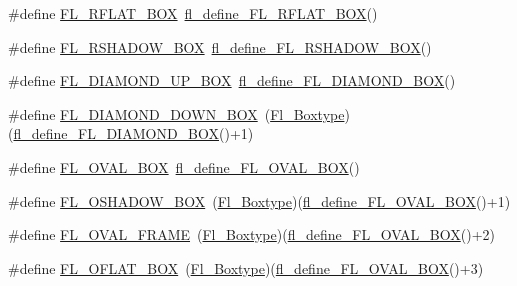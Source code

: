 \begin{DoxyCompactItemize}
\item 
\#define \hyperlink{_enumerations_8_h_a4a3f9e7a782892ca79eec39a02c704b4}{F\+L\+\_\+\+R\+F\+L\+A\+T\+\_\+\+B\+OX}~\hyperlink{_enumerations_8_h_a6f64fe52f3ed86bde407c67a61f5a2a4}{fl\+\_\+define\+\_\+\+F\+L\+\_\+\+R\+F\+L\+A\+T\+\_\+\+B\+OX}()
\item 
\#define \hyperlink{_enumerations_8_h_ad14eab3302b2d306b87e61e3bc93f127}{F\+L\+\_\+\+R\+S\+H\+A\+D\+O\+W\+\_\+\+B\+OX}~\hyperlink{_enumerations_8_h_a7c68477f8da9f5fc9af0b1d0e20d79a3}{fl\+\_\+define\+\_\+\+F\+L\+\_\+\+R\+S\+H\+A\+D\+O\+W\+\_\+\+B\+OX}()
\item 
\#define \hyperlink{_enumerations_8_h_a373a1c80f6eca4b7cb87fb311926755b}{F\+L\+\_\+\+D\+I\+A\+M\+O\+N\+D\+\_\+\+U\+P\+\_\+\+B\+OX}~\hyperlink{_enumerations_8_h_a137c1cb224a3e3aecb91608a1567e915}{fl\+\_\+define\+\_\+\+F\+L\+\_\+\+D\+I\+A\+M\+O\+N\+D\+\_\+\+B\+OX}()
\item 
\#define \hyperlink{_enumerations_8_h_a35f4e640a841d9ac769e4e916f57c79e}{F\+L\+\_\+\+D\+I\+A\+M\+O\+N\+D\+\_\+\+D\+O\+W\+N\+\_\+\+B\+OX}~(\hyperlink{_enumerations_8_h_ae48bf9070f8541de17829f54ccacc6bc}{Fl\+\_\+\+Boxtype})(\hyperlink{_enumerations_8_h_a137c1cb224a3e3aecb91608a1567e915}{fl\+\_\+define\+\_\+\+F\+L\+\_\+\+D\+I\+A\+M\+O\+N\+D\+\_\+\+B\+OX}()+1)
\item 
\#define \hyperlink{_enumerations_8_h_a0d921d8861d182c6f6f696f9db1113e9}{F\+L\+\_\+\+O\+V\+A\+L\+\_\+\+B\+OX}~\hyperlink{_enumerations_8_h_a36d20b2fd40d9665512ee16fe89670db}{fl\+\_\+define\+\_\+\+F\+L\+\_\+\+O\+V\+A\+L\+\_\+\+B\+OX}()
\item 
\#define \hyperlink{_enumerations_8_h_a38d2dcb555947ca32ac6facff8b4bc27}{F\+L\+\_\+\+O\+S\+H\+A\+D\+O\+W\+\_\+\+B\+OX}~(\hyperlink{_enumerations_8_h_ae48bf9070f8541de17829f54ccacc6bc}{Fl\+\_\+\+Boxtype})(\hyperlink{_enumerations_8_h_a36d20b2fd40d9665512ee16fe89670db}{fl\+\_\+define\+\_\+\+F\+L\+\_\+\+O\+V\+A\+L\+\_\+\+B\+OX}()+1)
\item 
\#define \hyperlink{_enumerations_8_h_a5e7d5d8837a106f25884e970d359194c}{F\+L\+\_\+\+O\+V\+A\+L\+\_\+\+F\+R\+A\+ME}~(\hyperlink{_enumerations_8_h_ae48bf9070f8541de17829f54ccacc6bc}{Fl\+\_\+\+Boxtype})(\hyperlink{_enumerations_8_h_a36d20b2fd40d9665512ee16fe89670db}{fl\+\_\+define\+\_\+\+F\+L\+\_\+\+O\+V\+A\+L\+\_\+\+B\+OX}()+2)
\item 
\#define \hyperlink{_enumerations_8_h_a250fe849afe4a72cebd9b58702aaac50}{F\+L\+\_\+\+O\+F\+L\+A\+T\+\_\+\+B\+OX}~(\hyperlink{_enumerations_8_h_ae48bf9070f8541de17829f54ccacc6bc}{Fl\+\_\+\+Boxtype})(\hyperlink{_enumerations_8_h_a36d20b2fd40d9665512ee16fe89670db}{fl\+\_\+define\+\_\+\+F\+L\+\_\+\+O\+V\+A\+L\+\_\+\+B\+OX}()+3)

\end{DoxyCompactItemize}
